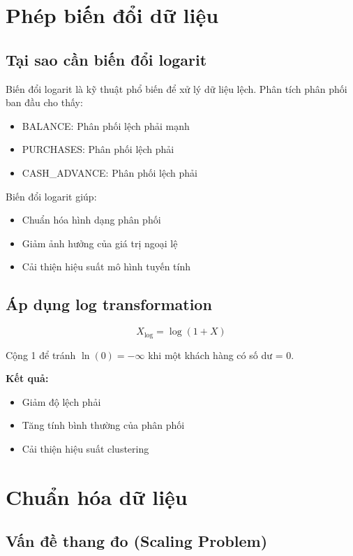\section{Phép biến đổi dữ liệu}

\subsection{Tại sao cần biến đổi logarit}

Biến đổi logarit là kỹ thuật phổ biến để xử lý dữ liệu lệch. Phân tích phân phối ban đầu cho thấy:
\begin{itemize}
    \item BALANCE: Phân phối lệch phải mạnh
    \item PURCHASES: Phân phối lệch phải
    \item CASH\_ADVANCE: Phân phối lệch phải
\end{itemize}

Biến đổi logarit giúp:
\begin{itemize}
    \item Chuẩn hóa hình dạng phân phối
    \item Giảm ảnh hưởng của giá trị ngoại lệ
    \item Cải thiện hiệu suất mô hình tuyến tính
\end{itemize}

\subsection{Áp dụng log transformation}

\begin{equation}
X_{\log} = \log(1 + X)
\end{equation}

Cộng 1 để tránh $\ln(0) = -\infty$ khi một khách hàng có số dư = 0.

\textbf{Kết quả:}
\begin{itemize}
    \item Giảm độ lệch phải
    \item Tăng tính bình thường của phân phối
    \item Cải thiện hiệu suất clustering
\end{itemize}

\section{Chuẩn hóa dữ liệu}

\subsection{Vấn đề thang đo (Scaling Problem)}

